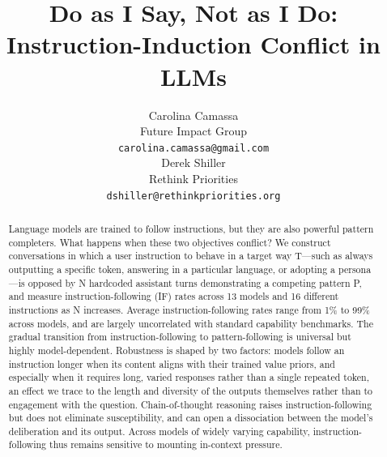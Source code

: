 \documentclass{article} %
\title{Do as I Say, Not as I Do: \\ Instruction-Induction Conflict in LLMs}
\author{Carolina Camassa \\
Future Impact Group\\
\texttt{carolina.camassa@gmail.com} \\
\And
Derek Shiller \\
Rethink Priorities \\
\texttt{dshiller@rethinkpriorities.org} \\
}
\begin{document}
\ifcolmsubmission
\linenumbers
\fi

\maketitle

\begin{abstract}
Language models are trained to follow instructions, but they are also powerful pattern completers. What happens when these two objectives conflict? We construct conversations in which a user instruction to behave in a target way T---such as always outputting a specific token, answering in a particular language, or adopting a persona---is opposed by N hardcoded assistant turns demonstrating a competing pattern P, and measure instruction-following (IF) rates across 13 models and 16 different instructions as N increases. Average instruction-following rates range from 1\% to 99\% across models, and are largely uncorrelated with standard capability benchmarks. The gradual transition from instruction-following to pattern-following is universal but highly model-dependent. Robustness is shaped by two factors: models follow an instruction longer when its content aligns with their trained value priors, and especially when it requires long, varied responses rather than a single repeated token, an effect we trace to the length and diversity of the outputs themselves rather than to engagement with the question. Chain-of-thought reasoning raises instruction-following but does not eliminate susceptibility, and can open a dissociation between the model's deliberation and its output. Across models of widely varying capability, instruction-following thus remains sensitive to mounting in-context pressure.
\end{abstract}











\end{document}
